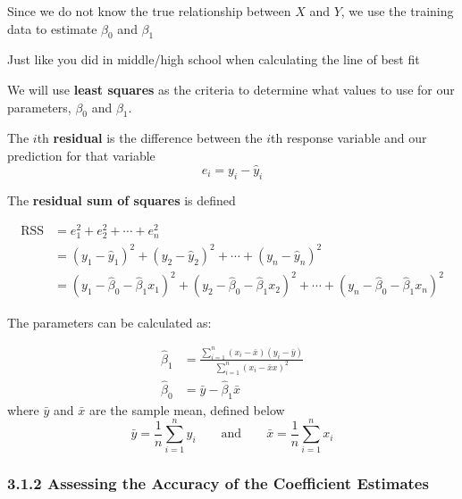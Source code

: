        Since we do not know the true relationship between \(X\) and \(Y\), we use the training data to estimate \(\beta_0\) and \(\beta_1\)

        \begin{note}
            Just like you did in middle/high school when calculating the line of best fit
        \end{note}
        
        We will use \textbf{least squares} as the criteria to determine what values to use for our parameters, \(\beta_0\) and \(\beta_1\).
        
        The \(i\)th \textbf{residual} is the difference between the \(i\)th response variable and our prediction for that variable
        \begin{equation*}
        e_i = y_i - \hat y_i
        \end{equation*}
        
        The \textbf{residual sum of squares} is defined
        
        
        \begin{align*}
            \text{RSS} &= e_1^2 + e_2^2 + \cdots + e_n^2 \\
            &= (y_1 - \hat y_1)^2 +  (y_2 - \hat y_2)^2 + \cdots +  (y_n- \hat y_n)^2 \\
            &= (y_1 - \hat \beta_0 - \hat \beta_1 x_1)^2 + (y_2 - \hat \beta_0 - \hat \beta_1 x_2)^2  + \cdots + (y_n - \hat \beta_0 - \hat \beta_1 x_n)^2 
        \end{align*}
        
        
        The parameters can be calculated as:
        
        \begin{align*}\tag{3.4}
        \hat \beta_1 &= \frac{\sum_{i=1}^n(x_i - \bar x)(y_i-\bar y)}{\sum_{i=1}^n(x_i - \bar xx)^2}\\
        \hat \beta_0 &= \bar y - \hat \beta_1 \bar x
    \end{align*}
     where \(\bar y\) and \(\bar x\) are the sample mean, defined below
     \begin{equation*}
           \bar y = \frac{1}{n}\sum_{i=1}^n y_i \qquad \text{and} \qquad \bar x = \frac{1}{n}\sum_{i=1}^n x_i
     \end{equation*}

        \subsubsection*{3.1.2 Assessing the Accuracy of the Coefficient Estimates}
